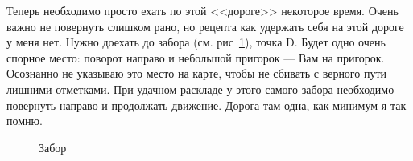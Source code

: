 \documentclass[a4paper, 12pt]{extarticle}
\begin{document}
\par Теперь необходимо просто ехать по этой <<дороге>> некоторое время. Очень важно не повернуть слишком рано, но рецепта как удержать себя на этой дороге у меня нет. Нужно доехать до забора (см. рис~\ref{ris:zabor}), точка D. Будет одно очень спорное место: поворот направо и небольшой пригорок --- Вам на пригорок. Осознанно не указываю это место на карте, чтобы не сбивать с верного пути лишними отметками. При удачном раскладе у этого самого забора необходимо повернуть направо и продолжать движение. Дорога там одна, как минимум я так помню.
\begin{figure}[h!]
	\caption{Забор}
	\label{ris:zabor}
\end{figure}
\end{document}
